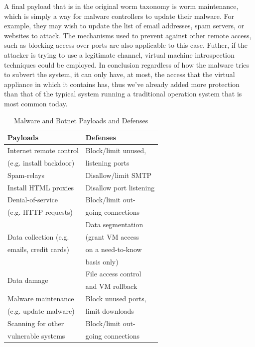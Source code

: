 A final payload that is in the original worm taxonomy is worm maintenance, which is simply a way for malware controllers to update their malware. For example, they may wish to update the list of email addresses, spam servers, or websites to attack. The mechanisms used to prevent against other remote access, such as blocking access over ports are also applicable to this case. Futher, if the attacker is trying to use a legitimate channel, virtual machine introspection techniques could be employed. In conclusion regardless of how the malware tries to subvert the system, it can only have, at most, the access that the virtual appliance in which it contains has, thus we've already added more protection than that of the typical system running a traditional operation system that is most common today. 

\begin{table}
\caption{Malware and Botnet Payloads and Defenses}
\begin{center}
\begin{tabular}{|l|l|}
\hline
\bf Payloads & \bf Defenses \\ \hline
Internet remote control & Block/limit unused, \\
(e.g. install backdoor) & listening ports \\ \hline
Spam-relays & Disallow/limit SMTP \\ \hline
Install HTML proxies & Disallow port listening \\ \hline
Denial-of-service & Block/limit out- \\
(e.g. HTTP requests) & going connections \\ \hline
& Data segmentation \\ %
Data collection (e.g. & (grant VM access   \\
emails, credit cards) & on a need-to-know \\
& basis only) \\ \hline
\multirow{2}{*}{Data damage} & File access control \\
& and VM rollback \\ \hline
Malware maintenance & Block unused ports, \\
(e.g. update malware) & limit downloads \\ \hline
Scanning for other & Block/limit out- \\
vulnerable systems & going connections \\ \hline
\end{tabular}
\end{center}
\end{table}

